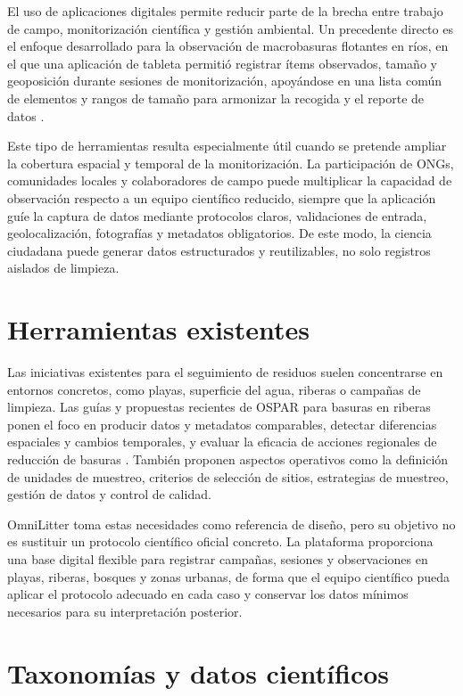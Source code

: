 El uso de aplicaciones digitales permite reducir parte de la brecha entre trabajo
de campo, monitorización científica y gestión ambiental. Un precedente directo es
el enfoque desarrollado para la observación de macrobasuras flotantes en ríos, en
el que una aplicación de tableta permitió registrar ítems observados, tamaño y
geoposición durante sesiones de monitorización, apoyándose en una lista común de
elementos y rangos de tamaño para armonizar la recogida y el reporte de datos
\cite{gonzalezfernandez2017harmonized}.

Este tipo de herramientas resulta especialmente útil cuando se pretende ampliar
la cobertura espacial y temporal de la monitorización. La participación de ONGs,
comunidades locales y colaboradores de campo puede multiplicar la capacidad de
observación respecto a un equipo científico reducido, siempre que la aplicación
guíe la captura de datos mediante protocolos claros, validaciones de entrada,
geolocalización, fotografías y metadatos obligatorios. De este modo, la ciencia
ciudadana puede generar datos estructurados y reutilizables, no solo registros
aislados de limpieza.

\section{Herramientas existentes}

Las iniciativas existentes para el seguimiento de residuos suelen concentrarse en
entornos concretos, como playas, superficie del agua, riberas o campañas de
limpieza. Las guías y propuestas recientes de OSPAR para basuras en riberas
ponen el foco en producir datos y metadatos comparables, detectar diferencias
espaciales y cambios temporales, y evaluar la eficacia de acciones regionales de
reducción de basuras \cite{ospar2025monitoring}. También proponen aspectos
operativos como la definición de unidades de muestreo, criterios de selección de
sitios, estrategias de muestreo, gestión de datos y control de calidad.

OmniLitter toma estas necesidades como referencia de diseño, pero su objetivo no
es sustituir un protocolo científico oficial concreto. La plataforma proporciona
una base digital flexible para registrar campañas, sesiones y observaciones en
playas, riberas, bosques y zonas urbanas, de forma que el equipo científico pueda
aplicar el protocolo adecuado en cada caso y conservar los datos mínimos
necesarios para su interpretación posterior.

\section{Taxonomías y datos científicos}

